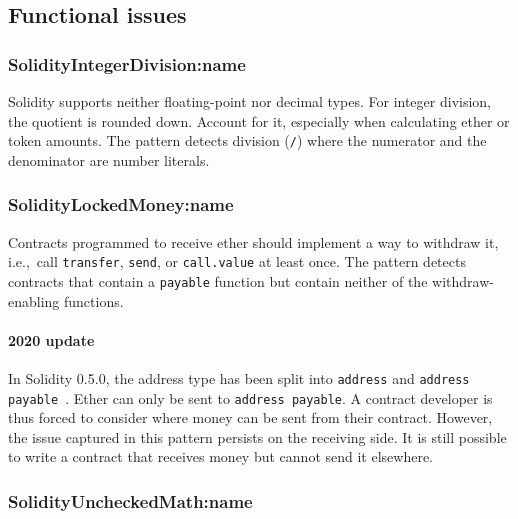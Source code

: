 \subsection{Functional issues} \label{sec:FunctionalIssues}

\subsubsection{\let\letcs\texapiletcs \usevalue SolidityIntegerDivision:name \let\letcs\etoolboxletcs} \label{SolidityIntegerDivision}

Solidity supports neither floating-point nor decimal types.
For integer division, the quotient is rounded down.
Account for it, especially when calculating ether or token amounts.
The pattern detects division (\texttt{/}) where the numerator and the denominator are number literals.

\subsubsection{\let\letcs\texapiletcs \usevalue SolidityLockedMoney:name \let\letcs\etoolboxletcs} \label{SolidityLockedMoney}

Contracts programmed to receive ether should implement a way to withdraw it, i.e.,~call \texttt{transfer}, \texttt{send}, or \texttt{call.value} at least once.
The pattern detects contracts that contain a \texttt{payable} function but contain neither of the withdraw-enabling functions.

\paragraph{2020 update}
In Solidity 0.5.0, the address type has been split into \texttt{address} and \texttt{address payable}~\cite{Solidity050}.
Ether can only be sent to \texttt{address payable}.
A contract developer is thus forced to consider where money can be sent from their contract.
However, the issue captured in this pattern persists on the receiving side.
It is still possible to write a contract that receives money but cannot send it elsewhere.

\subsubsection{\let\letcs\texapiletcs \usevalue SolidityUncheckedMath:name \let\letcs\etoolboxletcs} \label{SolidityUncheckedMath}

